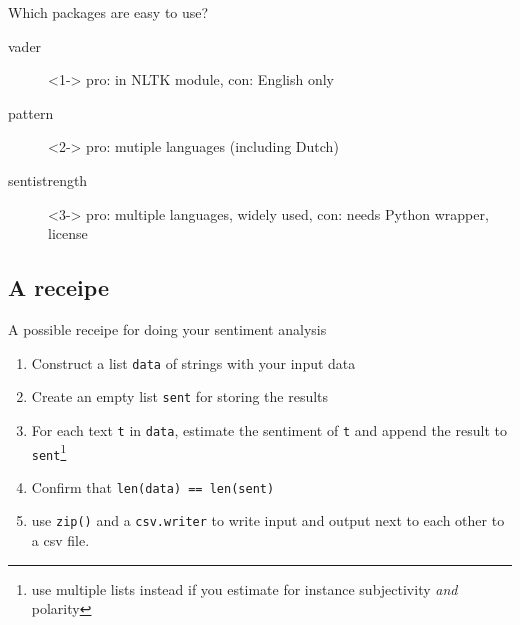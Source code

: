 \documentclass{beamer}
\begin{document}
\begin{frame}{Which packages are easy to use?}
	
\begin{description}
	\item[vader]<1-> pro: in NLTK module, con: English only
	\item[pattern]<2-> pro: mutiple languages (including Dutch)
	\item[sentistrength]<3-> pro: multiple languages, widely used, con: needs Python wrapper, license
	
\end{description}




\end{frame}



\subsection{A receipe}

\begin{frame}{A possible receipe for doing your sentiment analysis}
	
\begin{enumerate}
	\item Construct a list \texttt{data} of strings with your input data
	\item Create an empty list \texttt{sent} for storing the results
	\item For each text \texttt{t} in \texttt{data}, estimate the sentiment of \texttt{t} and append the result to \texttt{sent}\footnote{use multiple lists instead if you estimate for instance subjectivity \emph{and} polarity}
	\item Confirm that \texttt{len(data) == len(sent)}
	\item use \texttt{zip()} and a  \texttt{csv.writer} to write input and output next to each other to a csv file.
\end{enumerate}

\end{frame}
\end{document}
